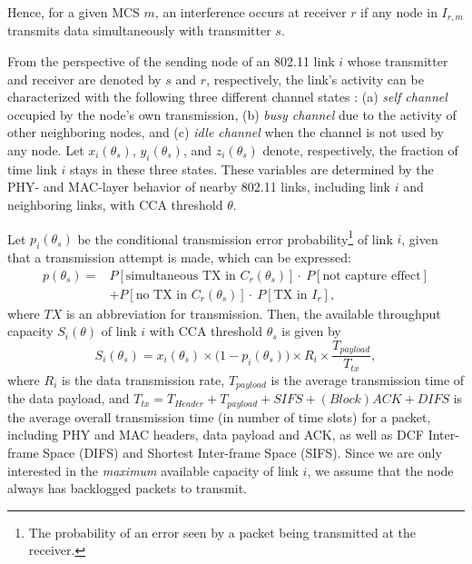 {Hence, for a given MCS $m$, an interference occurs at receiver $r$ if
any node in $I_{r,m}$ transmits data simultaneously with transmitter $s$.

From the perspective of the sending node of an 802.11 link $i$
whose transmitter and receiver are denoted by $s$ and $r$, respectively,
the link's activity can be characterized with the following
three different channel states \cite{Gao:06}:
(a) \emph{self channel} occupied by the node's own transmission,
(b) \emph{busy channel} due to the activity of other neighboring nodes,
and (c) \emph{idle channel} when the channel is not used by any node.
%
Let ${x}_i(\theta_s)$, ${y}_{i}(\theta_s)$, and ${z}_{i}(\theta_s)$
denote, respectively, the fraction of time link $i$ stays in these
three states.
%
These variables are determined by the PHY- and MAC-layer
behavior of nearby 802.11 links, including link $i$
and neighboring links, with CCA threshold $\theta$.

Let $p_i(\theta_s)$ be the conditional transmission error
probability\footnote{The probability of an error seen by
a packet being transmitted at the receiver.} of link $i$,
given that a transmission attempt is made, which can be expressed:
\begin{eqnarray}
p(\theta_s)=&P[\text{simultaneous TX in }C_{r}(\theta_s)]\!\cdot\
\!P[\text{not capture effect}] \nonumber \\
&+ P[\text{no TX in }C_{r}(\theta_s)]\!\cdot\
\!P[\text{TX in }I_{r}],
\end{eqnarray}
where $TX$ is an abbreviation for transmission.
%
Then, the available throughput capacity $S_i(\theta)$ of link $i$
with CCA threshold $\theta_s$ is given by
\begin{equation}
S_i(\theta_s) = {x}_i(\theta_s) \times \Big(1 - p_i(\theta_s)\Big) \times R_i \times
\frac{T_{payload}}{T_{tx}},
\end{equation}
where $R_i$ is the data transmission rate, $T_{payload}$ is the
average transmission time of the data payload, and
$T_{tx} = T_{Header} + T_{payload}+ SIFS + (Block)ACK + DIFS $
is the average overall transmission time (in number of time slots) for
a packet, including PHY and MAC headers, data payload and ACK, as well
as DCF Inter-frame Space (DIFS) and Shortest Inter-frame Space (SIFS).
Since we are only interested in the \emph{maximum} available
capacity of link $i$, we assume that the node always has
backlogged packets to transmit.

}
